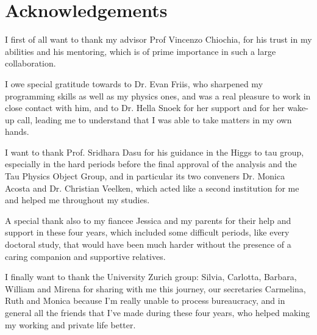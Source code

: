 \chapter*{Acknowledgements}

I first of all want to thank my advisor Prof Vincenzo Chiochia, for his trust in my abilities and his mentoring, which is of prime importance in such a large collaboration.

I owe special gratitude towards to Dr. Evan Friis, who sharpened my programming skills as well as my physics ones, and was a real pleasure to work in close contact with him, and to Dr. Hella Snoek for her support and for her wake-up call, leading me to understand that I was able to take matters in my own hands.

I want to thank Prof. Sridhara Dasu for his guidance in the Higgs to tau group, especially in the hard periods before the final approval of the analysis and the Tau Physics Object Group, and in particular its two conveners Dr. Monica Acosta and Dr. Christian Veelken, which acted like a second institution for me and helped me throughout my studies.

A special thank also to my fiancee Jessica and my parents for their help and support in these four years, which included some difficult periods, like every doctoral study, that would have been much harder without the presence of a caring companion and supportive relatives.

I finally want to thank the University Zurich group: Silvia, Carlotta, Barbara, William and Mirena for sharing with me this journey, our secretaries Carmelina, Ruth and Monica because I'm really unable to process bureaucracy, and in general all the friends that I've made during these four years, who helped making my working and private life better.

